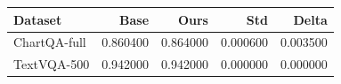 \begin{tabular}{lrrrr}
\toprule
Dataset & Base & Ours & Std & Delta \\
\midrule
ChartQA-full & 0.860400 & 0.864000 & 0.000600 & 0.003500 \\
TextVQA-500 & 0.942000 & 0.942000 & 0.000000 & 0.000000 \\
\bottomrule
\end{tabular}
